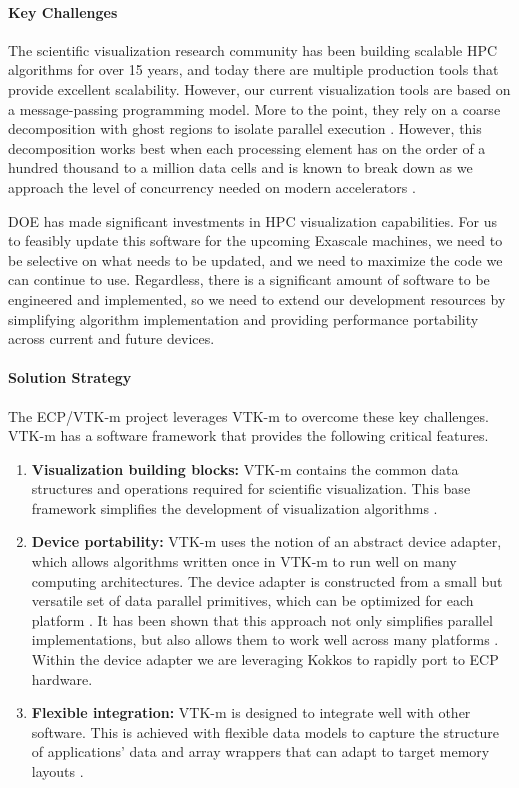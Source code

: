 \paragraph{Key Challenges}
The scientific visualization research community has been building scalable HPC algorithms for over 15 years, and today there are multiple production tools that provide excellent scalability.
However, our current visualization tools are based on a message-passing programming model.
More to the point, they rely on a coarse decomposition with ghost regions to isolate parallel execution \cite{Ahrens2001,Childs2010}.
However, this decomposition works best when each processing element has on the order of a hundred thousand to a million data cells \cite{ParaViewTutorial} and is known to break down as we approach the level of concurrency needed on modern accelerators \cite{Moreland2012:Ultravis,Moreland2013:UltraVis}.

DOE has made significant investments in HPC visualization capabilities.
For us to feasibly update this software for the upcoming Exascale machines, we need to be selective on what needs to be updated, and we need to maximize the code we can continue to use.
Regardless, there is a significant amount of software to be engineered and implemented, so we need to extend our development resources by simplifying algorithm implementation and providing performance portability across current and future devices.


\paragraph{Solution Strategy}
The ECP/VTK-m project leverages VTK-m \cite{Moreland2016:VTKm} to overcome these key challenges.
VTK-m has a software framework that provides the following critical features.

\begin{enumerate}
\item \textbf{Visualization building blocks:}
  VTK-m contains the common data structures and operations required for scientific visualization.
  This base framework simplifies the development of visualization algorithms \cite{VTKmUsersGuide}.
\item \textbf{Device portability:}
  VTK-m uses the notion of an abstract device adapter, which allows algorithms written once in VTK-m to run well on many computing architectures.
  The device adapter is constructed from a small but versatile set of data parallel primitives, which can be optimized for each platform \cite{Blelloch1990}.
  It has been shown that this approach not only simplifies parallel implementations, but also allows them to work well across many platforms \cite{Lo2012,Larsen2015,Moreland2015}.
  Within the device adapter we are leveraging Kokkos \cite{Edwards2011} to rapidly port to ECP hardware.
\item \textbf{Flexible integration:}
  VTK-m is designed to integrate well with other software.
  This is achieved with flexible data models to capture the structure of applications' data \cite{Meredith2012} and array wrappers that can adapt to target memory layouts \cite{Moreland2012:PDAC}.
\end{enumerate}

